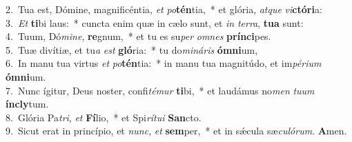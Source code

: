 {2.~}Tua est, Dómine, magnificéntia, \textit{et} \textit{po}\textbf{tén}tia,~* et glória, \textit{at}\textit{que} \textit{vi}\textbf{ctó}\textbf{ri}a:\\
{3.~}\textit{Et} \textbf{ti}bi laus:~* cuncta enim quæ in cælo sunt, et \textit{in} \textit{ter}\textit{ra}, \textbf{tu}\textbf{a} sunt:\\
{4.~}Tuum, Dó\textit{mi}\textit{ne}, \textbf{re}gnum,~* et tu es su\textit{per} \textit{om}\textit{nes} \textbf{prín}\textbf{ci}pes.\\
{5.~}Tuæ divítiæ, et tu\textit{a} \textit{est} \textbf{gló}ria:~* tu do\textit{mi}\textit{ná}\textit{ris} \textbf{óm}\textbf{ni}um,\\
{6.~}In manu tua virtus \textit{et} \textit{po}\textbf{tén}tia:~* in manu tua magnitúdo, et im\textit{pé}\textit{ri}\textit{um} \textbf{óm}\textbf{ni}um.\\
{7.~}Nunc ígitur, Deus noster, confi\textit{té}\textit{mur} \textbf{ti}bi,~* et laudámus no\textit{men} \textit{tu}\textit{um} \textbf{ín}\textbf{cly}tum.\\
{8.~}Glória Pa\textit{tri}, \textit{et} \textbf{Fí}lio,~* et Spi\textit{rí}\textit{tu}\textit{i} \textbf{San}cto.\\
{9.~}Sicut erat in princípio, et \textit{nunc}, \textit{et} \textbf{sem}per,~* et in sǽcula sæ\textit{cu}\textit{ló}\textit{rum}. \textbf{A}men.\\
